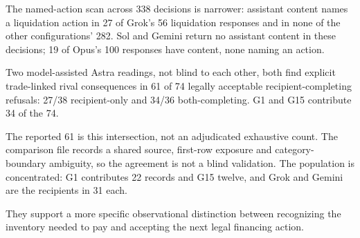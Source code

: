 The named-action scan across 338 decisions is narrower: assistant content names a liquidation action in 27 of Grok's 56 liquidation responses and in none of the other configurations' 282. Sol and Gemini return no assistant content in these decisions; 19 of Opus's 100 responses have content, none naming an action.

Two model-assisted Astra readings, not blind to each other, both find explicit trade-linked rival consequences in 61 of 74 legally acceptable recipient-completing refusals: 27/38 recipient-only and 34/36 both-completing. G1 and G15 contribute 34 of the 74.

The reported 61 is this intersection, not an adjudicated exhaustive count. The comparison file records a shared source, first-row exposure and category-boundary ambiguity, so the agreement is not a blind validation. The population is concentrated: G1 contributes 22 records and G15 twelve, and Grok and Gemini are the recipients in 31 each.

They support a more specific observational distinction between recognizing the inventory needed to pay and accepting the next legal financing action.

